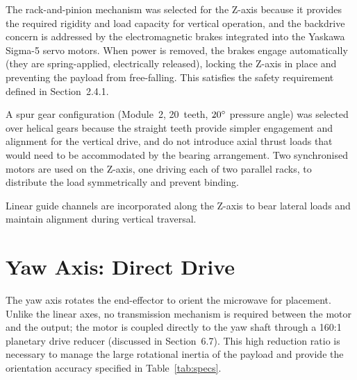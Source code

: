 The rack-and-pinion mechanism was selected for the Z-axis because it provides the required rigidity and load capacity for vertical operation, and the backdrive concern is addressed by the electromagnetic brakes integrated into the Yaskawa Sigma-5 servo motors. When power is removed, the brakes engage automatically (they are spring-applied, electrically released), locking the Z-axis in place and preventing the payload from free-falling. This satisfies the safety requirement defined in Section~2.4.1.

A spur gear configuration (Module~2, 20~teeth, $20\degree$ pressure angle) was selected over helical gears because the straight teeth provide simpler engagement and alignment for the vertical drive, and do not introduce axial thrust loads that would need to be accommodated by the bearing arrangement. Two synchronised motors are used on the Z-axis, one driving each of two parallel racks, to distribute the load symmetrically and prevent binding.

Linear guide channels are incorporated along the Z-axis to bear lateral loads and maintain alignment during vertical traversal.

\section{Yaw Axis: Direct Drive}

The yaw axis rotates the end-effector to orient the microwave for placement. Unlike the linear axes, no transmission mechanism is required between the motor and the output; the motor is coupled directly to the yaw shaft through a 160:1 planetary drive reducer (discussed in Section~6.7). This high reduction ratio is necessary to manage the large rotational inertia of the payload and provide the orientation accuracy specified in Table~\ref{tab:specs}.